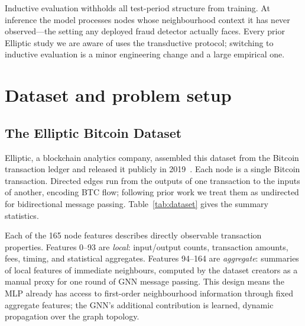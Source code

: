 Inductive evaluation withholds all test-period structure from training.
At inference the model processes nodes whose neighbourhood context it
has never observed---the setting any deployed fraud detector actually
faces.  Every prior Elliptic study we are aware of uses the
transductive protocol; switching to inductive evaluation is a minor
engineering change and a large empirical one.


\section{Dataset and problem setup}
\label{sec:dataset}

\subsection{The Elliptic Bitcoin Dataset}

Elliptic, a blockchain analytics company, assembled this dataset from
the Bitcoin transaction ledger and released it publicly in
2019~\citep{weber2019}.  Each node is a single Bitcoin transaction.
Directed edges run from the outputs of one transaction to the inputs
of another, encoding BTC flow; following prior work we treat them as
undirected for bidirectional message passing.
Table~\ref{tab:dataset} gives the summary statistics.

Each of the 165 node features describes directly observable transaction
properties.  Features 0--93 are \emph{local}: input/output counts,
transaction amounts, fees, timing, and statistical aggregates.
Features 94--164 are \emph{aggregate}: summaries of local features of
immediate neighbours, computed by the dataset creators as a manual
proxy for one round of GNN message passing.  This design means the MLP
already has access to first-order neighbourhood information through
fixed aggregate features; the GNN's additional contribution is
learned, dynamic propagation over the graph topology.

